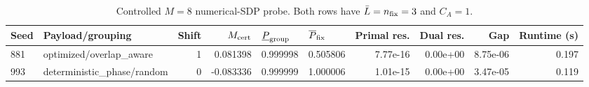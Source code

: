 \begin{table}[htbp]
\centering
\caption{Controlled $M=8$ numerical-SDP probe. Both rows have $\bar L=n_{\rm fix}=3$ and $C_A=1$.}\label{tab:supp-m8}
\scriptsize
\begin{tabular}{llrrllrrrr}
\toprule
Seed & Payload/grouping & Shift & $M_{\rm cert}$ & $\underline P_{\rm group}$ & $\overline P_{\rm fix}$ & Primal res. & Dual res. & Gap & Runtime (s)\\
\midrule
881 & optimized/overlap\_aware & 1 & 0.081398 & 0.999998 & 0.505806 & 7.77e-16 & 0.00e+00 & 8.75e-06 & 0.197\\
993 & deterministic\_phase/random & 0 & -0.083336 & 0.999999 & 1.000006 & 1.01e-15 & 0.00e+00 & 3.47e-05 & 0.119\\
\bottomrule
\end{tabular}
\end{table}
